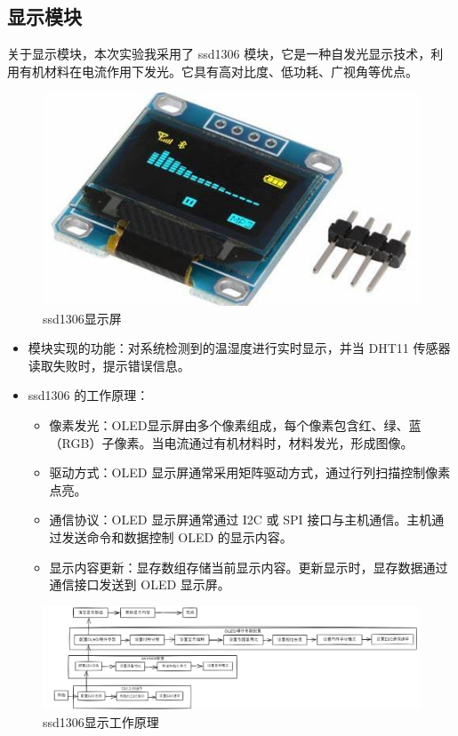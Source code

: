 \documentclass[UTF8]{ctexart}
\begin{document}
\subsection{显示模块}
关于显示模块，本次实验我采用了 ssd1306 模块，它是一种自发光显示技术，利用有机材料在电流作用下发光。它具有高对比度、低功耗、广视角等优点。
\begin{figure}[htbp]
	\centering
	\includegraphics[width=0.28\linewidth]{figure/5}
	\caption{ssd1306显示屏} %
	\label{fig:image3} %
\end{figure}
\begin{itemize}
	\item 模块实现的功能：对系统检测到的温湿度进行实时显示，并当 DHT11 传感器读取失败时，提示错误信息。
	\item ssd1306 的工作原理：
	\begin{itemize}
		\item 像素发光：OLED显示屏由多个像素组成，每个像素包含红、绿、蓝（RGB）子像素。当电流通过有机材料时，材料发光，形成图像。
		\item 驱动方式：OLED 显示屏通常采用矩阵驱动方式，通过行列扫描控制像素点亮。
		\item 通信协议：OLED 显示屏通常通过 I2C 或 SPI 接口与主机通信。主机通过发送命令和数据控制 OLED 的显示内容。
		\item 显示内容更新：显存数组存储当前显示内容。更新显示时，显存数据通过通信接口发送到 OLED 显示屏。
	\end{itemize}
\end{itemize}
\begin{figure}[htbp]
	\centering
	\includegraphics[width=1\linewidth]{figure/6}
	\caption{ssd1306显示工作原理} %
	\label{fig:image4} %
\end{figure}
\end{document}
